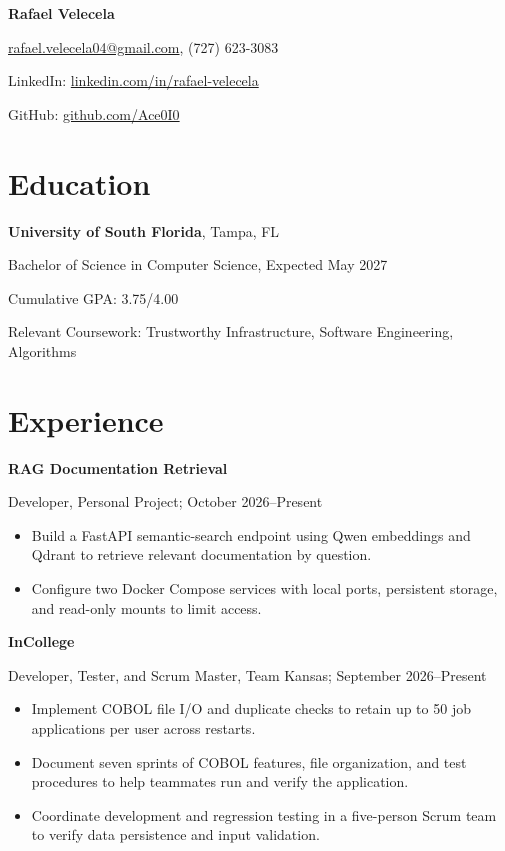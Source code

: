 \documentclass[11pt]{article}
\begin{document}
{\fontsize{14}{16}\selectfont\bfseries Rafael Velecela}\par
\href{mailto:rafael.velecela04@gmail.com}{rafael.velecela04@gmail.com}, (727) 623-3083\par
LinkedIn: \href{https://www.linkedin.com/in/rafael-velecela/}{linkedin.com/in/rafael-velecela}\par
GitHub: \href{https://github.com/Ace0I0}{github.com/Ace0I0}

\section*{Education}
\textbf{University of South Florida}, Tampa, FL\par
Bachelor of Science in Computer Science, Expected May 2027\par
Cumulative GPA: 3.75/4.00\par
Relevant Coursework: Trustworthy Infrastructure, Software Engineering, Algorithms

\section*{Experience}
\textbf{RAG Documentation Retrieval}\par
Developer, Personal Project; October 2026--Present
\begin{itemize}
    \item Build a FastAPI semantic-search endpoint using Qwen embeddings and Qdrant to retrieve relevant documentation by question.
    \item Configure two Docker Compose services with local ports, persistent storage, and \mbox{read-only} mounts to limit access.
\end{itemize}

\textbf{InCollege}\par
Developer, Tester, and Scrum Master, Team Kansas; September 2026--Present
\begin{itemize}
    \item Implement COBOL file I/O and duplicate checks to retain up to 50 job applications per user across restarts.
    \item Document seven sprints of COBOL features, file organization, and test procedures to help teammates run and verify the application.
    \item Coordinate development and regression testing in a five-person Scrum team to verify data persistence and input validation.
\end{itemize}
\end{document}

